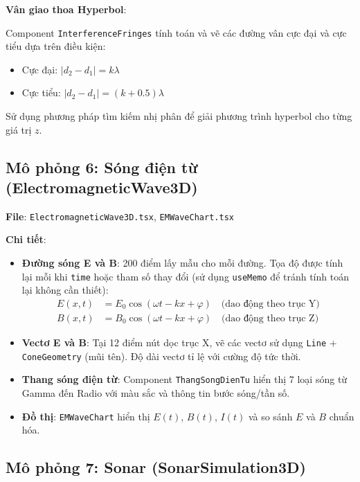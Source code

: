 \textbf{Vân giao thoa Hyperbol}:

Component \texttt{InterferenceFringes} tính toán và vẽ các đường vân cực đại và cực tiểu dựa trên điều kiện:
\begin{itemize}
    \item Cực đại: $|d_2 - d_1| = k\lambda$
    \item Cực tiểu: $|d_2 - d_1| = (k + 0.5)\lambda$
\end{itemize}
Sử dụng phương pháp tìm kiếm nhị phân để giải phương trình hyperbol cho từng giá trị $z$.

\subsection{Mô phỏng 6: Sóng điện từ (ElectromagneticWave3D)}

\textbf{File}: \texttt{ElectromagneticWave3D.tsx}, \texttt{EMWaveChart.tsx}

\textbf{Chi tiết}:

\begin{itemize}
    \item \textbf{Đường sóng E và B}: 200 điểm lấy mẫu cho mỗi đường. Tọa độ được tính lại mỗi khi \texttt{time} hoặc tham số thay đổi (sử dụng \texttt{useMemo} để tránh tính toán lại không cần thiết):
    \begin{align*}
        E(x,t) &= E_0 \cos(\omega t - kx + \varphi) \quad \text{(dao động theo trục Y)} \\
        B(x,t) &= B_0 \cos(\omega t - kx + \varphi) \quad \text{(dao động theo trục Z)}
    \end{align*}
    
    \item \textbf{Vectơ E và B}: Tại 12 điểm nút dọc trục X, vẽ các vectơ sử dụng \texttt{Line} + \texttt{ConeGeometry} (mũi tên). Độ dài vectơ tỉ lệ với cường độ tức thời.
    
    \item \textbf{Thang sóng điện từ}: Component \texttt{ThangSongDienTu} hiển thị 7 loại sóng từ Gamma đến Radio với màu sắc và thông tin bước sóng/tần số.
    
    \item \textbf{Đồ thị}: \texttt{EMWaveChart} hiển thị $E(t)$, $B(t)$, $I(t)$ và so sánh $E$ và $B$ chuẩn hóa.
\end{itemize}

\subsection{Mô phỏng 7: Sonar (SonarSimulation3D)}

